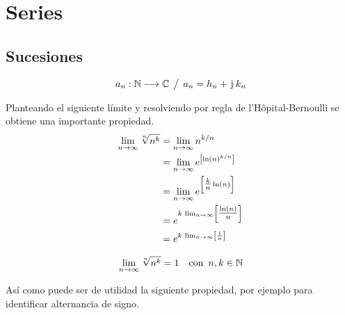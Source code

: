 \chapter{Series}

\section{Sucesiones}

\begin{mdframed}[style=DefinitionFrame]
    \begin{defn}
    \end{defn}
    \begin{equation*}
        a_n: \mathbb{N} \longrightarrow \mathbb{C} \hspace{1ex} \big/ \hspace{1ex} a_n = h_n + \mkern2mu\mathrm{j}\mkern1mu \, k_n
    \end{equation*}
\end{mdframed}

Planteando el siguiente límite y resolviendo por regla de l'Hôpital-Bernoulli se obtiene una importante propiedad.
\begin{align*}
    \lim_{n\to\infty} \sqrt[n]{n^k}
    &= \lim_{n\to\infty} n^{k/n}
    \\
    &= \lim_{n\to\infty} e^{\left[ \ln(n)^{k/n} \right]}
    \\
    &= \lim_{n\to\infty} e^{\left[ \tfrac{k}{n} \ln(n) \right]}
    \\
    &= e^{k \, \lim_{n\to\infty} \left[ \tfrac{\ln(n)}{n} \right]}
    \\
    &= e^{k \, \lim_{n\to\infty} \left[ \frac{1}{n} \right]}
\end{align*}

\begin{mdframed}[style=PropertyFrame]
    \begin{prop}
    \end{prop}
    \begin{equation*}
        \lim_{n\to\infty} \sqrt[n]{n^k} = 1 \quad \textrm{con} \enspace n, k \in \mathbb{N}
    \end{equation*}
\end{mdframed}

Así como puede ser de utilidad la siguiente propiedad, por ejemplo para identificar alternancia de signo.

